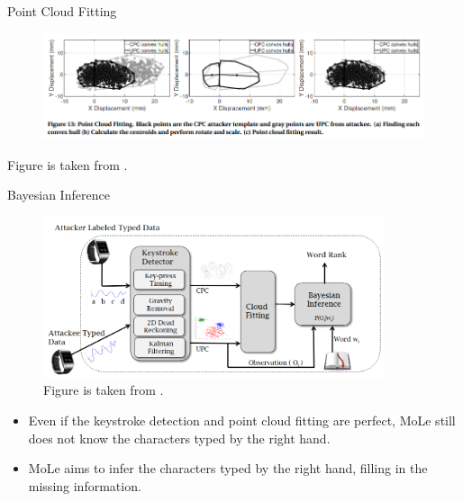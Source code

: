 \documentclass[ucs,9pt]{beamer}
\begin{document}
\begin{frame}{Point Cloud Fitting}	
	\begin{figure}
		\centering
		\includegraphics[width=\linewidth]{imgs/pointCloudFitting}
	\end{figure}
	\tiny \centering
	Figure is taken from \cite{b3}.
\end{frame}



\begin{frame}{Bayesian Inference}
\begin{figure}
	\centering
	\includegraphics[width=10cm]{imgs/moleOverview}
	\caption{Figure is taken from \cite{b1}.}
\end{figure}
	\begin{itemize}
		\item Even if the keystroke detection and point cloud fitting are perfect, MoLe still does not know the characters typed by the right hand.
		\item MoLe aims to infer the characters typed by the right hand, filling in the missing information.
	\end{itemize}
\end{frame}
\end{document}

